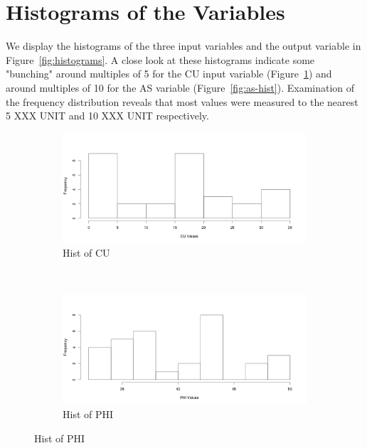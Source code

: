 \documentclass[a4paper,12pt, english]{article}
\begin{document}
\section{Histograms of the Variables}
We display the histograms of the three input variables and the output variable in Figure~\ref{fig:histograms}. A close look at these histograms indicate some "bunching" around multiples of 5 for the CU input variable (Figure~\ref{fig:cu-hist}) and around multiples of 10 for the AS variable (Figure~\ref{fig:as-hist}). Examination of the frequency distribution reveals that most values were measured to the nearest 5 XXX UNIT and 10 XXX UNIT respectively.
\begin{figure}[!htbp]
        \centering
        \begin{subfigure}[b]{0.45\textwidth}
                \includegraphics[width=\textwidth]{cu-hist}
                \caption{Hist of CU}
                \label{fig:cu-hist}
        \end{subfigure}%
        ~ %
        \begin{subfigure}[b]{0.45\textwidth}
                \includegraphics[width=\textwidth]{phi-hist}
                \caption{Hist of PHI}
                \label{fig:phi-hist}
        \end{subfigure}

\end{figure}
\end{document}
